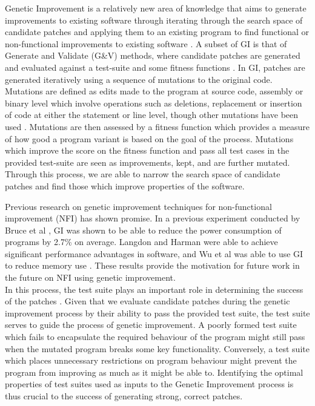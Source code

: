 \documentclass[titlepage]{article}
\begin{document}
Genetic Improvement is a relatively new area of knowledge that aims to generate improvements to existing software through iterating through the search space of candidate patches and applying them to an existing program to find functional or non-functional improvements to existing software \cite{petkesurvey}. A subset of GI is that of Generate and Validate (G\&V) methods, where candidate patches are generated and evaluated against a test-suite and some fitness functions \cite{harman2012,harman2007}. In GI, patches are generated iteratively using a sequence of mutations to the original code. Mutations are defined as edits made to the program at source code, assembly or binary level which involve operations such as deletions, replacement or insertion of code at either the statement or line level, though other mutations have been used \cite{petkesurvey}. Mutations are then assessed by a fitness function which provides a measure of how good a program variant is based on the goal of the process. Mutations which improve the score on the fitness function and pass all test cases in the provided test-suite are seen as improvements, kept, and are further mutated. Through this process, we are able to narrow the search space of candidate patches and find those which improve properties of the software.

Previous research on genetic improvement techniques for non-functional improvement (NFI) has shown promise. In a previous experiment conducted by Bruce et al \cite{bruceenergy}, GI was shown to be able to reduce the power consumption of programs by 2.7\% on average. Langdon and Harman were able to achieve significant performance advantages in software\cite{langdonharman2015}, and Wu et al was able to use GI to reduce memory use \cite{yuewu2015}. These results provide the motivation for future work in the future on NFI using genetic improvement.\\

In this process, the test suite plays an important role in determining the success of the patches \cite{qireiss2017}.  Given that we evaluate candidate patches during the genetic improvement process by their ability to pass the provided test suite, the test suite serves to guide the process of genetic improvement. A poorly formed test suite which fails to encapsulate the required behaviour of the program might still pass when the mutated program breaks some key functionality. Conversely, a test suite which places unnecessary restrictions on program behaviour might prevent the program from improving as much as it might be able to. Identifying the optimal properties of test suites used as inputs to the Genetic Improvement process is thus crucial to the success of generating strong, correct patches. 
\end{document}
